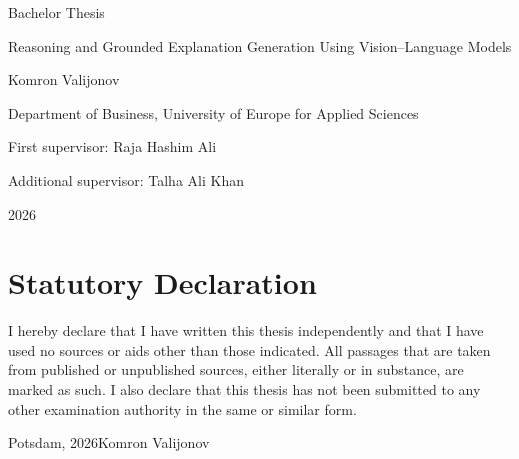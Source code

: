 \documentclass[12pt,bibliography=totoc,listof=totoc,BCOR=5mm,DIV=12,oneside,open=any]{scrbook}
\author{Komron Valijonov}
\begin{document}
\frontmatter
    \begin{titlepage}
        \centering
        \vspace*{2cm}
        {\Large Bachelor Thesis\par}
        \vspace{1.5cm}
        {\Large Reasoning and Grounded Explanation Generation Using Vision--Language Models\par}
        \vspace{2cm}
        {\Large Komron Valijonov\par}
        \vspace{0.5cm}
        {\large Department of Business, University of Europe for Applied Sciences\par}
        \vfill
        {\large First supervisor: Raja Hashim Ali\par}
        {\large Additional supervisor: Talha Ali Khan\par}
        \vspace{1cm}
        {\large 2026\par}
    \end{titlepage}
    \thispagestyle{empty}
    \clearpage

    \chapter*{Statutory Declaration}
    I hereby declare that I have written this thesis independently and that I have used no sources or aids other than those indicated.
    All passages that are taken from published or unpublished sources, either literally or in substance, are marked as such.
    I also declare that this thesis has not been submitted to any other examination authority in the same or similar form.

    \vspace{2cm}
    \noindent Potsdam, 2026\hfill Komron Valijonov
    \clearpage
\end{document}
